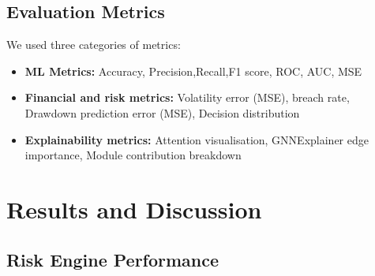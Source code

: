 \documentclass[conference]{IEEEtran}
\begin{document}
\subsection{Evaluation Metrics}
We used three categories of metrics: 
\begin{itemize}
    \item \textbf{ML Metrics:} Accuracy,  Precision,Recall,F1 score, ROC, AUC,  MSE
    \item \textbf{Financial and risk metrics:} Volatility error (MSE), breach rate, Drawdown prediction error (MSE), Decision distribution
    \item \textbf{Explainability metrics:} Attention visualisation, GNNExplainer edge importance, Module contribution breakdown
\end{itemize}
 
\section{Results and Discussion}
\subsection{Risk Engine Performance}
\end{document}
